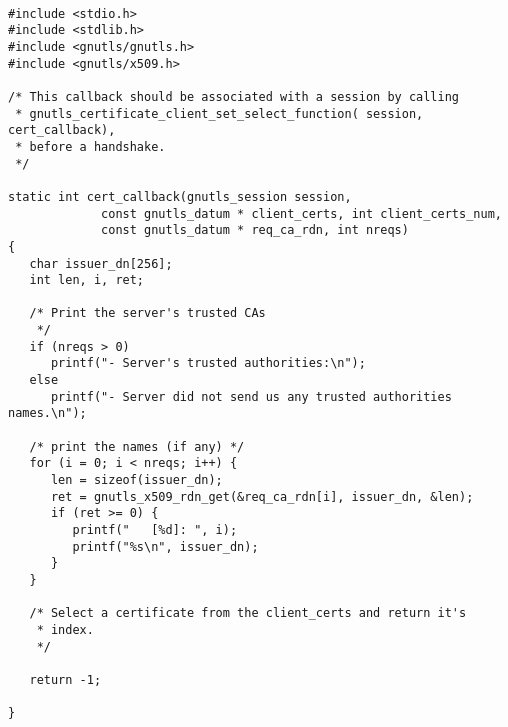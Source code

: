 \begin{verbatim}

#include <stdio.h>
#include <stdlib.h>
#include <gnutls/gnutls.h>
#include <gnutls/x509.h>

/* This callback should be associated with a session by calling
 * gnutls_certificate_client_set_select_function( session, cert_callback),
 * before a handshake.
 */

static int cert_callback(gnutls_session session,
			 const gnutls_datum * client_certs, int client_certs_num,
			 const gnutls_datum * req_ca_rdn, int nreqs)
{
   char issuer_dn[256];
   int len, i, ret;

   /* Print the server's trusted CAs
    */
   if (nreqs > 0)
      printf("- Server's trusted authorities:\n");
   else
      printf("- Server did not send us any trusted authorities names.\n");

   /* print the names (if any) */
   for (i = 0; i < nreqs; i++) {
      len = sizeof(issuer_dn);
      ret = gnutls_x509_rdn_get(&req_ca_rdn[i], issuer_dn, &len);
      if (ret >= 0) {
         printf("   [%d]: ", i);
         printf("%s\n", issuer_dn);
      }
   }

   /* Select a certificate from the client_certs and return it's
    * index.
    */

   return -1;

}

\end{verbatim}
